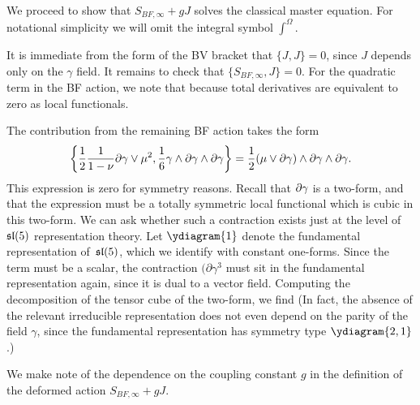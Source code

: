 \parsec[]
We proceed to show that $S_{BF,\infty} + g J$ solves the classical master equation.
For notational simplicity we will omit the integral symbol $\int^\Omega$.


It is immediate from the form of the BV bracket that $\{J,J\} = 0$, since $J$ depends only on the $\gamma$ field. 
It remains to check that $\{S_{BF,\infty},J\} = 0$. 
For the quadratic term in the BF action, we note that 
  because total derivatives are equivalent to zero as local functionals. 
  
The contribution from the remaining BF action takes the form
\[
    \left\{ \frac12 \frac{1}{1-\nu} \partial\gamma \vee \mu^2, \frac16 \gamma \wedge \partial\gamma \wedge \partial \gamma \right\} =\frac12 (\mu \vee \partial \gamma) \wedge \partial \gamma \wedge \partial \gamma .
\]
This expression is zero for symmetry reasons. 
Recall that $\partial\gamma$ is a two-form, and that the expression must be a totally symmetric local functional which is cubic in this two-form. We can ask whether such a  contraction exists just at the level of $\mathfrak{sl}(5)$ representation theory. Let $\ydiagram{1}$ denote the fundamental representation of~$\mathfrak{sl}(5)$, which we identify with constant one-forms. Since the term must be a scalar, the contraction $(\partial\gamma^3$ must sit in the fundamental representation again, since it is dual to a vector field. Computing the decomposition of the tensor cube of the two-form, we find
(In fact, the absence  of the relevant irreducible representation does not  even depend on the parity of the  field $\gamma$, since 
the  fundamental representation has symmetry type $\ydiagram{2,1}$.) 

\parsec[s:coupling]

We make note of the dependence on the coupling constant $g$ in the definition of the deformed action $S_{BF,\infty} + g J$. 

